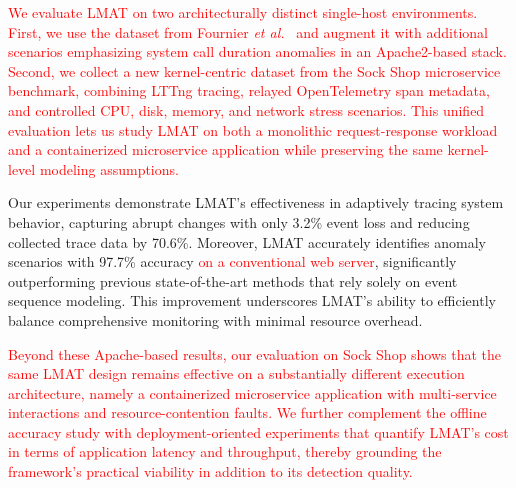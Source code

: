 \documentclass[preprint,12pt]{elsarticle}
\begin{document}
\textcolor{red}{We evaluate LMAT on two architecturally distinct single-host environments. First, we use the dataset from Fournier \textit{et al.}~\cite{fournier2023language} and augment it with additional scenarios emphasizing system call duration anomalies in an Apache2-based stack. Second, we collect a new kernel-centric dataset from the Sock Shop microservice benchmark, combining LTTng tracing, relayed OpenTelemetry span metadata, and controlled CPU, disk, memory, and network stress scenarios. This unified evaluation lets us study LMAT on both a monolithic request-response workload and a containerized microservice application while preserving the same kernel-level modeling assumptions.}

Our experiments demonstrate LMAT’s effectiveness in adaptively tracing system behavior, capturing abrupt changes with only 3.2\% event loss and reducing collected trace data by 70.6\%. Moreover, LMAT accurately identifies anomaly scenarios with 97.7\% accuracy \textcolor{red}{on a conventional web server}, significantly outperforming previous state-of-the-art methods that rely solely on event sequence modeling. This improvement underscores LMAT’s ability to efficiently balance comprehensive monitoring with minimal resource overhead.

\textcolor{red}{Beyond these Apache-based results, our evaluation on Sock Shop shows that the same LMAT design remains effective on a substantially different execution architecture, namely a containerized microservice application with multi-service interactions and resource-contention faults. We further complement the offline accuracy study with deployment-oriented experiments that quantify LMAT's cost in terms of application latency and throughput, thereby grounding the framework's practical viability in addition to its detection quality.}
\end{document}
